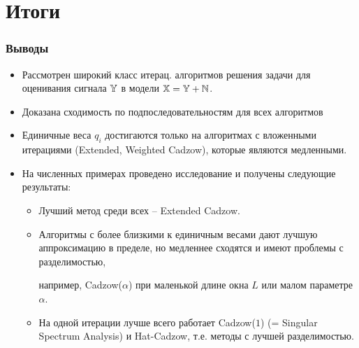 \documentclass[unicode, notheorems]{beamer}
\begin{document}
\section{Итоги}

%  


\begin{frame}
	\frametitle{Выводы}\footnotesize
	\begin{itemize}
		\item Рассмотрен широкий класс итерац. алгоритмов решения задачи 
		для оценивания сигнала $\mathbb{Y}$  в модели $\mathbb{X} = \mathbb{Y} + \mathbb{N}$.
		\item Доказана сходимость по подпоследовательностям для всех алгоритмов
		\item Единичные веса $q_i$ достигаются только на алгоритмах с вложенными итерациями (Extended, Weighted Cadzow), которые являются медленными.
		\item  На численных примерах проведено исследование и получены следующие результаты:
		\begin{itemize} \footnotesize
			\item Лучший метод среди всех -- Extended Cadzow.
			\item Алгоритмы с более близкими к единичным весами дают лучшую аппроксимацию в пределе, но медленнее сходятся и имеют проблемы с разделимостью,
			
			например, Cadzow($\alpha$) при маленькой  длине окна $L$ или малом параметре $\alpha$.
			\item На одной итерации лучше всего работает Cadzow($1$) (= Singular Spectrum Analysis) и Hat-Cadzow, т.е. методы с лучшей разделимостью.
		\end{itemize}
	\end{itemize}
	
\end{frame}
\end{document}

